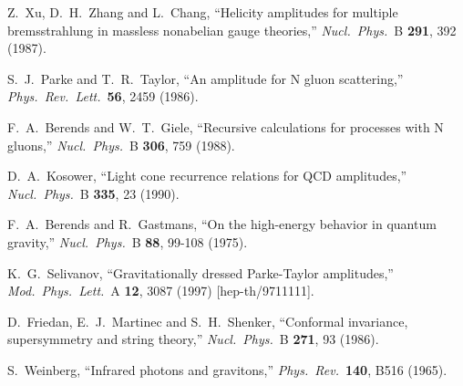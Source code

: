 \begin{thebibliography}{99}
Z.~Xu, D.~H.~Zhang and L.~Chang,
``Helicity amplitudes for multiple bremsstrahlung in massless nonabelian 
gauge theories,''
{\it Nucl.\ Phys.}\ B {\bf 291}, 392 (1987).

S.~J.~Parke and T.~R.~Taylor,
``An amplitude for N gluon scattering,''
{\it Phys.\ Rev.\ Lett.}\  {\bf 56}, 2459 (1986).

F.~A.~Berends and W.~T.~Giele,
``Recursive calculations for processes with N gluons,''
{\it Nucl.\ Phys.}\ B {\bf 306}, 759 (1988).

D.~A.~Kosower,
``Light cone recurrence relations for QCD amplitudes,''
{\it Nucl.\ Phys.}\ B {\bf 335}, 23 (1990).

F.~A.~Berends and R.~Gastmans,
``On the high-energy behavior in quantum gravity,''
{\it Nucl.\ Phys.}\ B {\bf 88}, 99-108 (1975).

K.~G.~Selivanov,
``Gravitationally dressed Parke-Taylor amplitudes,''
{\it Mod.\ Phys.\ Lett.}\ A {\bf 12}, 3087 (1997)
[hep-th/9711111].

D.~Friedan, E.~J.~Martinec and S.~H.~Shenker,
``Conformal invariance, supersymmetry and string theory,''
{\it Nucl.\ Phys.}\ B {\bf 271}, 93 (1986).

S.~Weinberg,
``Infrared photons and gravitons,''
{\it Phys.\ Rev.}\  {\bf 140}, B516 (1965).


\end{thebibliography}
